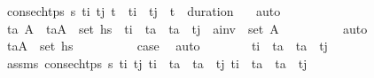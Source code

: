 \begin{isabellebody}
\ {\isacartoucheopen}consec{\isacharunderscore}{\kern0pt}htps\ {\isasympi}s\ t\isactrlsub i{\isacharprime}{\kern0pt}\ t\isactrlsub j{\isacharprime}{\kern0pt}{\isacartoucheclose}\ {\isacartoucheopen}t\isactrlsub {\isasympi}\ {\isasymle}\ t\isactrlsub i{\isacharprime}{\kern0pt}\ {\isasymand}\ t\isactrlsub j{\isacharprime}{\kern0pt}\ {\isasymle}\ t\isactrlsub {\isasympi}\ {\isacharplus}{\kern0pt}\ duration\ {\isasympi}{\isacartoucheclose}\ \isamarkupfalse%
\ auto\isanewline
\ \ \ \ \ \ \isamarkupfalse%
\ \isamarkupfalse%
\ t\isactrlsub a{\isacharprime}{\kern0pt}\ A{\isacharprime}{\kern0pt}\ \ {\isachardoublequoteopen}{\isacharparenleft}{\kern0pt}t\isactrlsub a{\isacharprime}{\kern0pt}{\isacharcomma}{\kern0pt}A{\isacharprime}{\kern0pt}{\isacharparenright}{\kern0pt}\ {\isasymin}\ set\ hs\ \ {\isachardoublequoteopen}t\isactrlsub i{\isacharprime}{\kern0pt}\ {\isacharless}{\kern0pt}\ t\isactrlsub a{\isacharprime}{\kern0pt}\ {\isasymand}\ t\isactrlsub a{\isacharprime}{\kern0pt}\ {\isacharless}{\kern0pt}\ t\isactrlsub j{\isacharprime}{\kern0pt}{\isachardoublequoteclose}\ \ {\isachardoublequoteopen}{\isacharquery}{\kern0pt}a\isactrlsub i\isactrlsub n\isactrlsub v\ {\isasymin}\ set\ A{\isacharprime}{\kern0pt}{\isachardoublequoteclose}\isanewline
\ \ \ \ \ \ \ \ \isamarkupfalse%
\ auto\isanewline
\ \ \ \ \ \ \isamarkupfalse%
\ \isamarkupfalse%
\ {\isachardoublequoteopen}{\isacharparenleft}{\kern0pt}t\isactrlsub a{\isacharprime}{\kern0pt}{\isacharcomma}{\kern0pt}A{\isacharprime}{\kern0pt}{\isacharparenright}{\kern0pt}\ {\isasymin}\ set\ hs\isanewline
\ \ \ \ \ \ \ \ \isamarkupfalse%
\ {\isacartoucheopen}{\isacharquery}{\kern0pt}case{}{\isacartoucheclose}\ \isamarkupfalse%
\ auto\isanewline
\ \ \ \ \ \ \isamarkupfalse%
\ {\isachardoublequoteopen}t\isactrlsub i\ {\isacharless}{\kern0pt}\ t\isactrlsub a{\isacharprime}{\kern0pt}\ {\isasymand}\ t\isactrlsub a{\isacharprime}{\kern0pt}\ {\isacharless}{\kern0pt}\ t\isactrlsub j{\isachardoublequoteclose}\isanewline
\ \ \ \ \ \ \ \ \isamarkupfalse%
\ assms\ {\isacartoucheopen}consec{\isacharunderscore}{\kern0pt}htps\ {\isasympi}s\ t\isactrlsub i{\isacharprime}{\kern0pt}\ t\isactrlsub j{\isacharprime}{\kern0pt}{\isacartoucheclose}\ {\isacartoucheopen}t\isactrlsub i\ {\isacharless}{\kern0pt}\ t\isactrlsub a\ {\isasymand}\ t\isactrlsub a\ {\isacharless}{\kern0pt}\ t\isactrlsub j{\isacartoucheclose}\ {\isacartoucheopen}t\isactrlsub i{\isacharprime}{\kern0pt}\ {\isacharless}{\kern0pt}\ t\isactrlsub a\ {\isasymand}\ t\isactrlsub a\ {\isacharless}{\kern0pt}\ t\isactrlsub j{\isacharprime}{\kern0pt}{\isacartoucheclose}\ \isanewline

\end{isabellebody}
